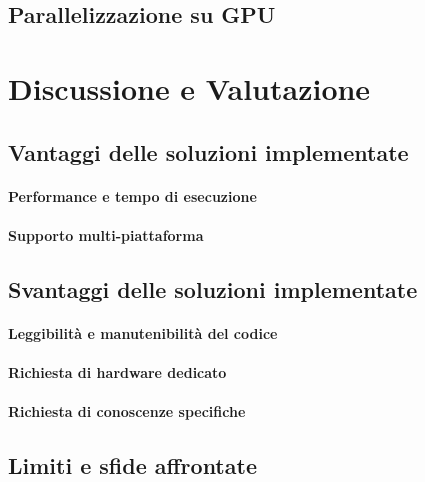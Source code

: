 \subsection{Parallelizzazione su GPU}
\label{subsec:cuda}

\lipsum[1]

\section{Discussione e Valutazione}
\label{ch:discussione}

\subsection{Vantaggi delle soluzioni implementate}
\label{subsec:vantaggi}

\lipsum[1]

\paragraph{Performance e tempo di esecuzione}
\label{para:performance}

\lipsum[1]

\paragraph{Supporto multi-piattaforma}
\label{para:supporto}

\lipsum[1]

\subsection{Svantaggi delle soluzioni implementate}
\label{sec:svantaggi}

\lipsum[1]

\paragraph{Leggibilità e manutenibilità del codice}
\label{para:leggibilita}

\lipsum[1]

\paragraph{Richiesta di hardware dedicato}
\label{para:hardware}

\lipsum[1]

\paragraph{Richiesta di conoscenze specifiche}
\label{para:conoscenze}

\lipsum[1]

\subsection{Limiti e sfide affrontate}
\label{subsec:limiti}

\lipsum[1]